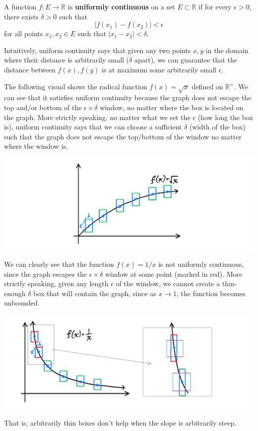   \begin{definition}
    A function $f: E \longrightarrow \mathbb{R}$ is \textbf{uniformly continuous} on a set $E \subset \mathbb{R}$ if for every $\epsilon > 0$, there exists $\delta > 0$ such that 
    \begin{equation}
      \big| f(x_1) - f(x_2)\big| < \epsilon
    \end{equation}
    for all points $x_1, x_2 \in E$ such that $|x_1 - x_2| < \delta$. 

    Intuitively, uniform continuity says that given any two points $x, y$ in the domain where their distance is arbitrarily small ($\delta$ apart), we can guarantee that the distance between $f(x), f(y)$ is at maximum some arbitrarily small $\epsilon$. 

    The following visual shows the radical function $f(x) = \sqrt{x}$ defined on $\mathbb{R}^+$. We can see that it satisfies uniform continuity because the graph does not escape the top and/or bottom of the $\epsilon \times \delta$ window, no matter where the box is located on the graph. More strictly speaking, no matter what we set the $\epsilon$ (how long the box is), uniform continuity says that we can choose a sufficient $\delta$ (width of the box) such that the graph does not escape the top/bottom of the window no matter where the window is. 
    \begin{center}
        \includegraphics[scale=0.28]{img/Uniform_Continuity_Radical.PNG}
    \end{center}
    We can clearly see that the function $f(x) = 1/x$ is not uniformly continuous, since the graph escapes the $\epsilon \times \delta$ window at some point (marked in red). More strictly speaking, given any length $\epsilon$ of the window, we cannot create a thin-enough $\delta$ box that will contain the graph, since as $x \rightarrow 1$, the function becomes unbounded. 
    \begin{center}
        \includegraphics[scale=0.25]{img/Uniform_Continuity_Rational.PNG}
    \end{center}
    That is, arbitrarily thin boxes don't help when the slope is arbitrarily steep. 
  \end{definition}

